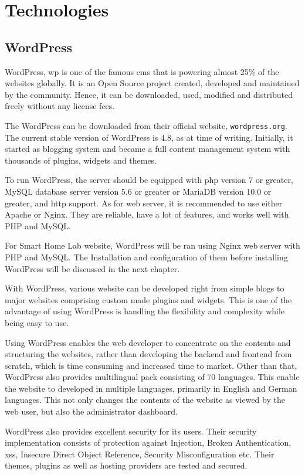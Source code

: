 \chapter{Technologies}
\section{WordPress}
WordPress, \ac{wp} is one of the famous \ac{cms} that is powering almost 25\% of the websites globally. It is an Open Source project created, developed and maintained by the community. Hence, it can be downloaded, used, modified and distributed freely without any license fees.

The WordPress can be downloaded from their official website, \texttt{wordpress.org}. The current stable version of WordPress is 4.8, as at time of writing. Initially, it started as blogging system and became a full content management system with thousands of plugins, widgets and themes.

To run WordPress, the server should be equipped with \ac{php} version 7 or greater, MySQL database server version 5.6 or greater or MariaDB version 10.0 or greater, and \ac{http} support. As for web server, it is recommended to use either Apache or Nginx. They are reliable, have a lot of features, and works well with PHP and MySQL.

For Smart Home Lab website, WordPress will be ran using Nginx web server with PHP and MySQL. The Installation and configuration of them before installing WordPress will be discussed in the next chapter.

With WordPress, various website can be developed right from simple blogs to major websites comprising custom made plugins and widgets. This is one of the advantage of using WordPress is handling the flexibility and complexity while being easy to use.

Using WordPress enables the web developer to concentrate on the contents and structuring the websites, rather than developing the backend and frontend from scratch, which is time consuming and increased time to market.
Other than that, WordPress also provides multilingual pack consisting of 70 languages. This enable the website to developed in multiple languages, primarily in English and German languages. This not only changes the contents of the website as viewed by the web user, but also the administrator dashboard.

WordPress also provides excellent security for its users. Their security implementation consists of protection against Injection, Broken Authentication, \ac{xss}, Insecure Direct Object Reference, Security Misconfiguration etc. Their themes, plugins as well as hosting providers are tested and secured.

